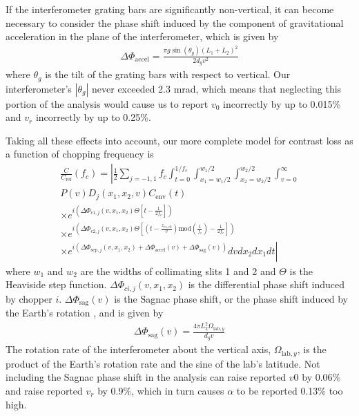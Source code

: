 \documentclass[twocolumn,prl,showpacs,superscriptaddress]{revtex4-1}   %
\newcommand{\Omegalab}{\Omega_{\mathrm{lab},y}}
\newcommand{\dphisepj}{\Delta\Phi_{\mathrm{sep},j}}
\newcommand{\dphisag}{\Delta\Phi_{\mathrm{sag}}}
\newcommand{\dphiaccel}{\Delta\Phi_{\mathrm{accel}}}
\newcommand{\cenv}{C_{\mathrm{env}}}
\begin{document}
If the interferometer grating bars are significantly non-vertical, it can become necessary to consider the phase shift induced by the component of gravitational acceleration in the plane of the interferometer, which is given by
\begin{align}
	\dphiaccel = \frac{\pi g\sin({\theta_g})(L_1+L_2)^2}{2d_g v^2}
	\label{phiAccel}
\end{align}
where $\theta_g$ is the tilt of the grating bars with respect to vertical. 
Our interferometer's $|\theta_g|$ never exceeded 2.3 mrad, which means that neglecting this portion of the analysis would cause us to report $v_0$ incorrectly by up to 0.015\% and $v_r$ incorrectly by up to 0.25\%.

Taking all these effects into account, our more complete model for contrast loss as a function of chopping frequency is
\begin{align}
	\frac{C}{C_{\mathrm{ref}}}(f_c) = 
	\left|
		\frac{1}{2} \sum_{j=-1,1}
		f_c \int_{t=0}^{1/f_c} 
		\int_{x_1=w_1/2}^{w_1/2}
		\int_{x_2=w_2/2}^{w_2/2}
		\int_{v=0}^{\infty}           
		\right. \nonumber \\
		P(v)
		D_j(x_1, x_2, v)
		\cenv(t)                   
		\nonumber \\ \times
		e^{i\left( \Delta\Phi_{c1,j}(v,x_1,x_2)\Theta\left[t-\frac{1}{2f_c}\right]\right)}
		\nonumber \\ \times		
		e^{i\left( 
			\Delta\Phi_{c2,j}(v,x_1,x_2)
			\Theta\left[\left(t-\frac{z_{c1,c2}}{v}\right)\mathrm{mod}\left(\frac{1}{f_c}\right) - \frac{1}{2f_c}\right] 
			\right)}
		\nonumber \\ \times \left.
		e^{i( \dphisepj(v,x_1,x_2) + \dphiaccel(v) + \dphisag(v) )}
		dv dx_{2} dx_{1} dt
	\right|
	\label{CvCF}
\end{align}
where $w_1$ and $w_2$ are the widths of collimating slits 1 and 2 and $\Theta$ is the Heaviside step function.
$\Delta\Phi_{ci,j}(v,x_1,x_2)$ is the differential phase shift induced by chopper $i$.
$\dphisag(v)$ is the Sagnac phase shift, or the phase shift induced by the Earth's rotation \cite{Lenef1997,Jacquey2008}, and is given by
\begin{align}
	\dphisag(v) = \frac{4\pi L_2^2\Omegalab}{d_g v}
	\label{phiSag}
\end{align}
The rotation rate of the interferometer about the vertical axis, $\Omegalab$, is the product of the Earth's rotation rate and the sine of the lab's latitude. Not including the Sagnac phase shift in the analysis can raise reported $v0$ by 0.06\% and raise reported $v_r$ by 0.9\%, which in turn causes $\alpha$ to be reported 0.13\% too high.
\end{document}
